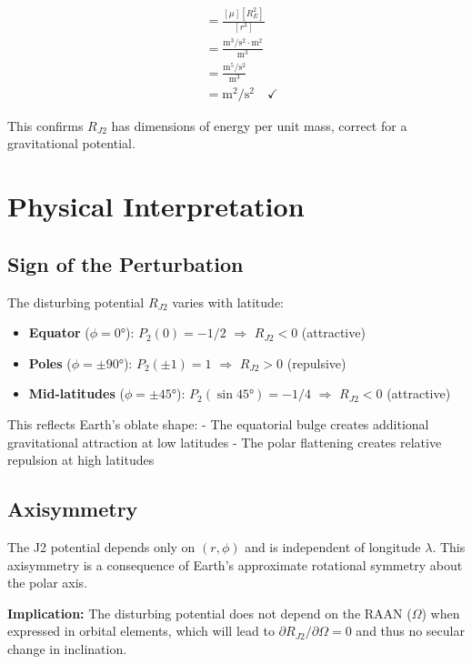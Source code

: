 \documentclass[11pt]{article}
\begin{document}
\begin{align}
[R_{J2}] &= \frac{[\mu][R_E^2]}{[r^3]}\\
&= \frac{\text{m}^3/\text{s}^2 \cdot \text{m}^2}{\text{m}^3}\\
&= \frac{\text{m}^5/\text{s}^2}{\text{m}^3}\\
&= \text{m}^2/\text{s}^2 \quad \checkmark
\end{align}

This confirms $R_{J2}$ has dimensions of energy per unit mass, correct for a gravitational potential.

\section{Physical Interpretation}

\subsection{Sign of the Perturbation}

The disturbing potential $R_{J2}$ varies with latitude:

\begin{itemize}
    \item \textbf{Equator} ($\phi = 0°$): $P_2(0) = -1/2$ $\Rightarrow$ $R_{J2} < 0$ (attractive)
    \item \textbf{Poles} ($\phi = \pm 90°$): $P_2(\pm 1) = 1$ $\Rightarrow$ $R_{J2} > 0$ (repulsive)
    \item \textbf{Mid-latitudes} ($\phi = \pm 45°$): $P_2(\sin 45°) = -1/4$ $\Rightarrow$ $R_{J2} < 0$ (attractive)
\end{itemize}

This reflects Earth's oblate shape:
- The equatorial bulge creates additional gravitational attraction at low latitudes
- The polar flattening creates relative repulsion at high latitudes

\subsection{Axisymmetry}

The J2 potential depends only on $(r, \phi)$ and is independent of longitude $\lambda$. This axisymmetry is a consequence of Earth's approximate rotational symmetry about the polar axis.

\textbf{Implication:} The disturbing potential does not depend on the RAAN ($\Omega$) when expressed in orbital elements, which will lead to $\partial R_{J2}/\partial \Omega = 0$ and thus no secular change in inclination.
\end{document}
